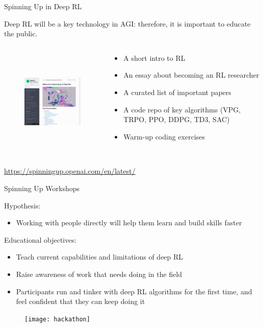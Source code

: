\documentclass[9pt]{beamer}
\begin{document}
\begin{frame}{Spinning Up in Deep RL}

Deep RL will be a key technology in AGI: therefore, it is important to educate the public.
\begin{columns}
\begin{column}{0.5\textwidth}
\begin{figure}
\centering
\includegraphics[height=5cm]{spinningup_website}
\end{figure}
\end{column}
\begin{column}{0.5\textwidth}
\begin{itemize}
\item A short intro to RL 
\item An essay about becoming an RL researcher
\item A curated list of important papers
\item A code repo of key algorithms (VPG, TRPO, PPO, DDPG, TD3, SAC)
\item Warm-up coding exercises
\end{itemize}
\end{column}
\end{columns}
\begin{center}
\url{https://spinningup.openai.com/en/latest/}
\end{center}

\end{frame}

\begin{frame}{Spinning Up Workshops}

Hypothesis:
\begin{itemize}
\item Working with people directly will help them learn and build skills faster
\end{itemize}

Educational objectives:
\begin{itemize}
\item Teach current capabilities and limitations of deep RL
\item Raise awareness of work that needs doing in the field
\item Participants run and tinker with deep RL algorithms for the first time, and feel confident that they can keep doing it
\end{itemize}
\begin{figure}
\centering
\texttt{[image: hackathon]}
\end{figure}

\end{frame}
\end{document}
